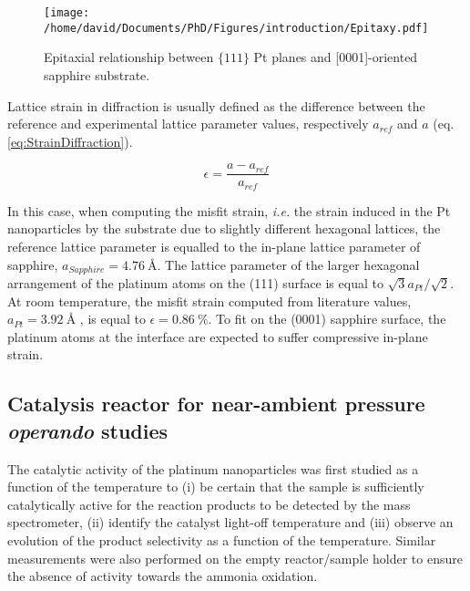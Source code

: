 \begin{figure}
    \centering
    \texttt{[image: /home/david/Documents/PhD/Figures/introduction/Epitaxy.pdf]}
    \caption{
        Epitaxial relationship between $\{111\}$ Pt planes and [0001]-oriented sapphire substrate.
    }
    \label{fig:Epitaxy}
\end{figure}%

Lattice strain in diffraction is usually defined as the difference between the reference and experimental lattice parameter values, respectively $a_{ref}$ and $a$ (eq. \ref{eq:StrainDiffraction}).

\begin{equation}
    \epsilon = \frac{a - a_{ref}}{a_{ref}}
    \label{eq:StrainDiffraction}
\end{equation}

In this case, when computing the misfit strain, \textit{i.e.} the strain induced in the Pt nanoparticles by the substrate due to slightly different hexagonal lattices, the reference lattice parameter is equalled to the in-plane lattice parameter of sapphire, $a_{Sapphire} = \qty{4.76}{\angstrom}$.
The lattice parameter of the larger hexagonal arrangement of the platinum atoms on the (111) surface is equal to $\sqrt{3} a_{Pt} / \sqrt{2}$.
At room temperature, the misfit strain computed from literature values, $a_{Pt} = \qty{3.92}{\angstrom}$ \parencite{Waseda1975}, is equal to $\epsilon = \qty{0.86}{\percent}$.
To fit on the (0001) sapphire surface, the platinum atoms at the interface are expected to suffer compressive in-plane strain.

\subsection{Catalysis reactor for near-ambient pressure \textit{operando} studies}

The catalytic activity of the platinum nanoparticles was first studied as a function of the temperature to (i) be certain that the sample is sufficiently catalytically active for the reaction products to be detected by the mass spectrometer, (ii) identify the catalyst light-off temperature and (iii) observe an evolution of the product selectivity as a function of the temperature.
Similar measurements were also performed on the empty reactor/sample holder to ensure the absence of activity towards the ammonia oxidation.

